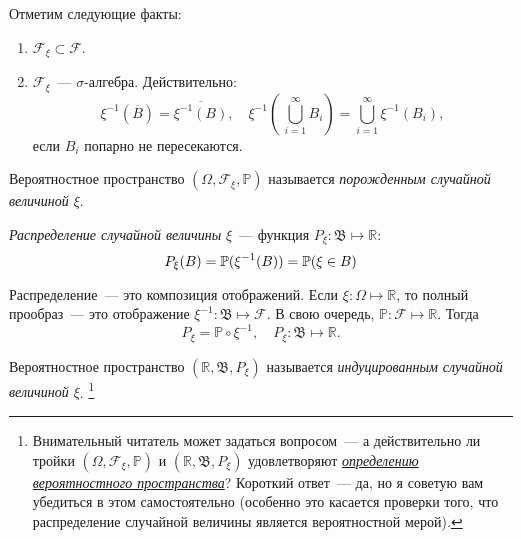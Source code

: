 Отметим следующие факты:
\begin{enumerate}
    \item $\mathcal{F}_\xi \subset \mathcal{F}.$
    \item $\mathcal{F}_\xi$~--- ${\sigma \text{-алгебра}}$. Действительно:
    \begin{equation*}
        \xi^{-1}(\overline{B}) = \overline{\xi^{-1}(B)}, \quad
        \xi^{-1}\left(\, \bigcup\limits_{i=1}^{\infty}B_i \right) = \bigcup\limits_{i=1}^\infty \xi^{-1}(B_i),
    \end{equation*}
   если $B_i$ попарно не пересекаются.
\end{enumerate}

\begin{defn}
    Вероятностное пространство $(\Omega,\mathcal{F}_\xi,\mathbb{P})$ называется \textit{порожденным случайной величиной $\xi$}.
\end{defn}

\begin{defn}
    \textit{Распределение случайной величины} $\xi$~--- функция ${P_\xi: \mathfrak{B} \mapsto \mathbb{R}}$:
    \begin{equation*}
        P_\xi(B) = {\mathbb{P}(\xi^{-1}(B))} = {\mathbb{P}(\xi \in B)}
    \end{equation*}
\end{defn}

\begin{rmrk}
    Распределение~--- это композиция отображений. Если ${\xi\colon \Omega \mapsto \mathbb{R}}$, то полный прообраз~--- это отображение ${\xi^{-1}\colon \mathfrak{B} \mapsto \mathcal{F}}$. В свою очередь, ${\mathbb{P}\colon \mathcal{F} \mapsto \mathbb{R}}$. Тогда
    \begin{equation*}
        P_{\xi} = \mathbb{P} \circ \xi^{-1}, \quad P_{\xi}\colon \mathfrak{B} \mapsto \mathbb{R}.
    \end{equation*}
\end{rmrk}

\hypertarget{induced_prob_space}{}
\begin{defn}
    Вероятностное пространство $(\mathbb{R}, \mathfrak{B}, P_\xi)$ называется \textit{индуцированным случайной величиной $\xi$}. 
        \footnote{{Внимательный читатель может задаться вопросом~--- а действительно ли тройки $\left(\Omega, \mathcal{F}_{\xi}, \mathbb{P}\right)$ и $\left(\mathbb{R}, \mathfrak{B}, P_{\xi}\right)$ удовлетворяют \hyperlink{prob_space}{\textit{определению вероятностного пространства}}}? 
        Короткий ответ~--- да, но я советую вам убедиться в этом самостоятельно 
        (особенно это касается проверки того, что распределение случайной величины является вероятностной мерой).}
\end{defn}


